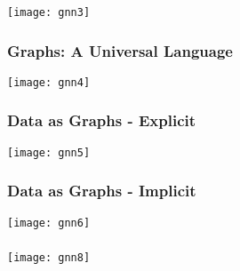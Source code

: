 \begin{frame}[fragile]\frametitle{}

\begin{center}
\texttt{[image: gnn3]}
\end{center}	  

\end{frame}

\begin{frame}[fragile]\frametitle{Graphs: A Universal Language }

\begin{center}
\texttt{[image: gnn4]}
\end{center}	  

\end{frame}


\begin{frame}[fragile]\frametitle{Data as Graphs - Explicit }

\begin{center}
\texttt{[image: gnn5]}
\end{center}	  

\end{frame}

\begin{frame}[fragile]\frametitle{Data as Graphs - Implicit }

\begin{center}
\texttt{[image: gnn6]}
\end{center}	  

\end{frame}



\begin{frame}[fragile]\frametitle{}

\begin{center}
\texttt{[image: gnn8]}
\end{center}	  

\end{frame}


